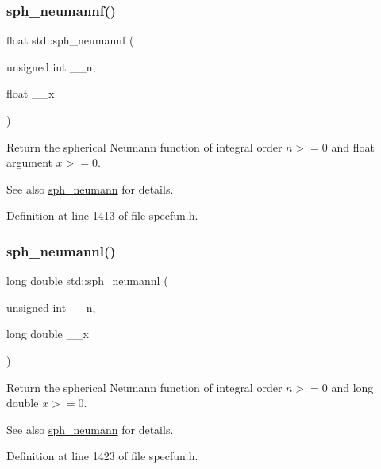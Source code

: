 \subsubsection{\texorpdfstring{sph\+\_\+neumannf()}{sph\_neumannf()}}
{\footnotesize\ttfamily float std\+::sph\+\_\+neumannf (\begin{DoxyParamCaption}\item[{unsigned int}]{\+\_\+\+\_\+n,  }\item[{float}]{\+\_\+\+\_\+x }\end{DoxyParamCaption})\hspace{0.3cm}{\ttfamily [inline]}}

Return the spherical Neumann function of integral order $ n >= 0 $ and {\ttfamily float} argument $ x >= 0 $.

\begin{DoxySeeAlso}{See also}
\hyperlink{group__cxx17__math__spec__func_ga01cdd716aaca8ff3c08f307800fd5220}{sph\+\_\+neumann} for details. 
\end{DoxySeeAlso}


Definition at line 1413 of file specfun.\+h.

\mbox{\label{group__cxx17__math__spec__func_ga3cededa9b6e4601f190c3811e6aabfd6}} 
\subsubsection{\texorpdfstring{sph\+\_\+neumannl()}{sph\_neumannl()}}
{\footnotesize\ttfamily long double std\+::sph\+\_\+neumannl (\begin{DoxyParamCaption}\item[{unsigned int}]{\+\_\+\+\_\+n,  }\item[{long double}]{\+\_\+\+\_\+x }\end{DoxyParamCaption})\hspace{0.3cm}{\ttfamily [inline]}}

Return the spherical Neumann function of integral order $ n >= 0 $ and {\ttfamily long double} $ x >= 0 $.

\begin{DoxySeeAlso}{See also}
\hyperlink{group__cxx17__math__spec__func_ga01cdd716aaca8ff3c08f307800fd5220}{sph\+\_\+neumann} for details. 
\end{DoxySeeAlso}


Definition at line 1423 of file specfun.\+h.

